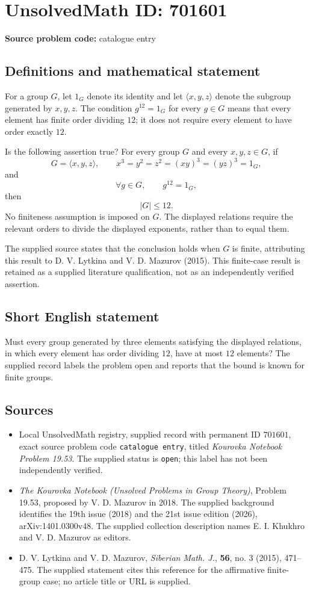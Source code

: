 \documentclass[11pt]{article}
\begin{document}
\section*{UnsolvedMath ID: 701601}
\textbf{Source problem code:} catalogue entry
\subsection{Definitions and mathematical statement}
For a group \(G\), let \(1_G\) denote its identity and let \(\langle x,y,z\rangle\) denote the subgroup generated by \(x,y,z\). The condition \(g^{12}=1_G\) for every \(g\in G\) means that every element has finite order dividing \(12\); it does not require every element to have order exactly \(12\).

Is the following assertion true? For every group \(G\) and every \(x,y,z\in G\), if
\[
G=\langle x,y,z\rangle,\qquad
x^3=y^2=z^2=(xy)^3=(yz)^3=1_G,
\]
and
\[
\forall g\in G,\qquad g^{12}=1_G,
\]
then
\[
|G|\leq 12.
\]
No finiteness assumption is imposed on \(G\). The displayed relations require the relevant orders to divide the displayed exponents, rather than to equal them.

The supplied source states that the conclusion holds when \(G\) is finite, attributing this result to D. V. Lytkina and V. D. Mazurov (2015). This finite-case result is retained as a supplied literature qualification, not as an independently verified assertion.
\subsection{Short English statement}
Must every group generated by three elements satisfying the displayed relations, in which every element has order dividing \(12\), have at most \(12\) elements? The supplied record labels the problem open and reports that the bound is known for finite groups.
\subsection{Sources}
\begin{itemize}
\item Local UnsolvedMath registry, supplied record with permanent ID \(701601\), exact source problem code \texttt{catalogue entry}, titled \emph{Kourovka Notebook Problem 19.53}. The supplied status is \texttt{open}; this label has not been independently verified.
\item \emph{The Kourovka Notebook (Unsolved Problems in Group Theory)}, Problem 19.53, proposed by V. D. Mazurov in 2018. The supplied background identifies the 19th issue (2018) and the 21st issue edition (2026), arXiv:1401.0300v48. The supplied collection description names E. I. Khukhro and V. D. Mazurov as editors.
\item D. V. Lytkina and V. D. Mazurov, \emph{Siberian Math. J.}, \textbf{56}, no. 3 (2015), 471--475. The supplied statement cites this reference for the affirmative finite-group case; no article title or URL is supplied.
\end{itemize}
\end{document}
